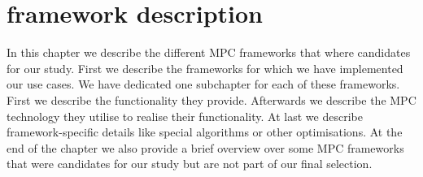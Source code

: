 \chapter{framework description}
In this chapter we describe the different MPC frameworks that where candidates for our study. First we describe the frameworks for which we have implemented our use cases. We have dedicated one subchapter for each of these frameworks.
First we describe the functionality they provide. Afterwards we describe the MPC technology they utilise to realise their functionality. At last we describe framework-specific details like special algorithms or other optimisations. At the end of the chapter we also provide a brief overview over some MPC frameworks that were candidates for our study but are not part of our final selection.

